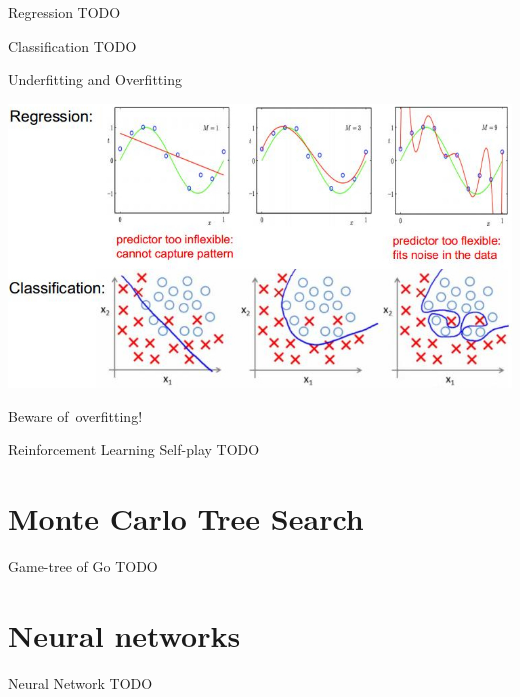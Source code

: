 \documentclass{beamer}
\newcommand{\todo}{\alert{TODO}}
\begin{document}
  \begin{frame}{Regression}
    \todo
  \end{frame}

  \begin{frame}{Classification}
    \todo
  \end{frame}

  {
    \begin{frame}{Underfitting and Overfitting}
      \begin{center}
        \includegraphics[width=.75\textwidth]{../img/underfitting_and_overfitting.jpg}
        \pause

        Beware of~overfitting!
      \end{center}
    \end{frame}
  }

  \begin{frame}{Reinforcement Learning}
    \alert{Self-play}
    \todo
  \end{frame}


  \section{Monte Carlo Tree Search}
  \begin{frame}{Game-tree of Go}
    \todo
  \end{frame}


  \section{Neural networks}
  \begin{frame}{Neural Network}
    \todo
  \end{frame}
\end{document}
